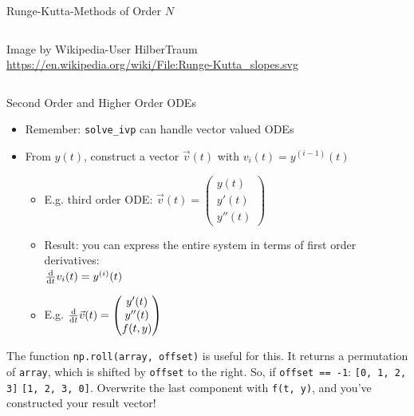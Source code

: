 \begin{frame}{Runge-Kutta-Methods of Order $N$}
\begin{columns}
\scriptsize
Image by Wikipedia-User HilberTraum\\
\url{https://en.wikipedia.org/wiki/File:Runge-Kutta_slopes.svg}
\end{columns}
%
\end{frame}


\begin{frame}{Second Order and Higher Order ODEs}
%
\begin{itemize}
\item Remember: \texttt{solve\_ivp} can handle vector valued ODEs
\item From $y(t)$, construct a vector $\vec{v}(t)$ with $v_i(t) = y^{(i-1)}(t)$
	\begin{itemize}
	\item E.\;g. third order ODE: $
		\vec{v}(t) = 
		\begin{pmatrix}
			y(t) \\
			y'(t) \\
			y''(t)
		\end{pmatrix}$
	\item Result: you can express the entire system in terms of first order derivatives:\\
		$\dv{t} v_i(t) = y^{(i)}(t)$
	\item E.\;g. $
		\dv{t} \vec{v}(t) = 
		\begin{pmatrix}
			y'(t) \\
			y''(t) \\
			f(t, y)
		\end{pmatrix}$
	\end{itemize}
\end{itemize}
%
\begin{hintbox}
\footnotesize
The function \texttt{np.roll(array, offset)} is useful for this. It returns a permutation of \texttt{array}, which is shifted by \texttt{offset} to the right. So, if \texttt{offset == -1}: \texttt{[0, 1, 2, 3]} \thus \texttt{[1, 2, 3, 0]}. Overwrite the last component with \texttt{f(t, y)}, and you've constructed your result vector!
\end{hintbox}
%
\end{frame}


